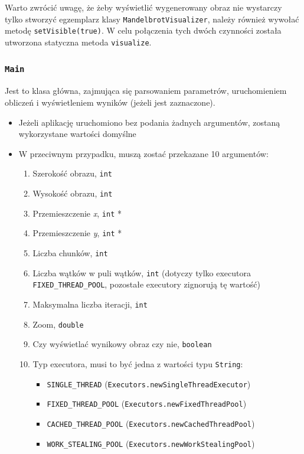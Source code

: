 \documentclass[11pt]{article}
\providecommand{\tightlist}{%
      \setlength{\itemsep}{0pt}\setlength{\parskip}{0pt}}
\begin{document}
Warto zwrócić uwagę, że żeby wyświetlić wygenerowany obraz nie wystarczy
tylko stworzyć egzemplarz klasy \texttt{MandelbrotVisualizer}, należy
również wywołać metodę \texttt{setVisible(true)}. W celu połączenia tych
dwóch czynności została utworzona statyczna metoda \texttt{visualize}.

    \hypertarget{main}{%
\subsubsection{\texorpdfstring{\texttt{Main}}{Main}}\label{main}}

Jest to klasa główna, zajmująca się parsowaniem parametrów,
uruchomieniem obliczeń i wyświetleniem wyników (jeżeli jest zaznaczone).

\begin{itemize}
\tightlist
\item
  Jeżeli aplikację uruchomiono bez podania żadnych argumentów, zostaną
  wykorzystane wartości domyślne
\item
  W przeciwnym przypadku, muszą zostać przekazane 10 argumentów:

  \begin{enumerate}
  \def\labelenumi{\arabic{enumi}.}
  \tightlist
  \item
    Szerokość obrazu, \texttt{int}
  \item
    Wysokość obrazu, \texttt{int}
  \item
    Przemieszczenie \emph{x}, \texttt{int} *
  \item
    Przemieszczenie \emph{y}, \texttt{int} *
  \item
    Liczba chunków, \texttt{int}
  \item
    Liczba wątków w puli wątków, \texttt{int} (dotyczy tylko executora
    \texttt{FIXED\_THREAD\_POOL}, pozostałe executory zignorują tę
    wartość)
  \item
    Maksymalna liczba iteracji, \texttt{int}
  \item
    Zoom, \texttt{double}
  \item
    Czy wyświetlać wynikowy obraz czy nie, \texttt{boolean}
  \item
    Typ executora, musi to być jedna z wartości typu \texttt{String}:

    \begin{itemize}
    \tightlist
    \item
      \texttt{SINGLE\_THREAD}
      (\texttt{Executors.newSingleThreadExecutor})
    \item
      \texttt{FIXED\_THREAD\_POOL}
      (\texttt{Executors.newFixedThreadPool})
    \item
      \texttt{CACHED\_THREAD\_POOL}
      (\texttt{Executors.newCachedThreadPool})
    \item
      \texttt{WORK\_STEALING\_POOL}
      (\texttt{Executors.newWorkStealingPool})
    \end{itemize}
  \end{enumerate}
\end{itemize}
\end{document}
